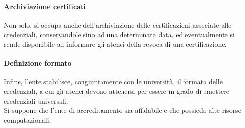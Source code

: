 \documentclass[a4paper,12pt]{article}
\begin{document}
\paragraph{Archiviazione certificati}Non solo, si occupa anche dell'archiviazione delle certificazioni associate alle credenziali, conservandole sino ad una determinata data, ed eventualmente si rende disponibile ad informare gli atenei della revoca di una certificazione.
\paragraph{Definizione formato} Infine, l'ente stabilisce, congiuntamente con le università, il formato delle credenziali, a cui gli atenei devono attenersi per essere in grado di emettere credenziali universali.
\\[0.5em]Si suppone che l'ente di accreditamento sia affidabile e che possieda alte risorse computazionali.
\end{document}
